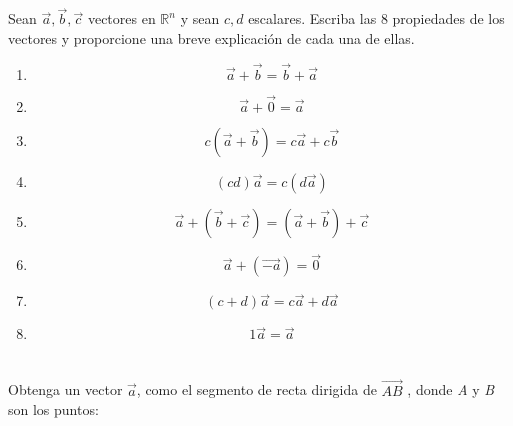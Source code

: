 \documentclass[12pt]{article}
\begin{document}
\section{}

Sean $\vec{a} , \vec{b} , \vec{c}$ vectores en $\mathbb{R}^n$ y sean $c,d$ escalares. Escriba las 8 propiedades de los vectores y proporcione una breve explicación de cada una de ellas.

\begin{enumerate}

\item $$\vec{a}+\vec{b} = \vec{b}+\vec{a}$$

\item $$\vec{a}+\vec{0} = \vec{a}$$

\item $$c(\vec{a}+\vec{b}) = c\vec{a}+c\vec{b}$$

\item $$(cd)\vec{a} = c(d\vec{a})$$

\item $$\vec{a}+(\vec{b}+\vec{c}) = (\vec{a}+\vec{b})+\vec{c}$$

\item $$\vec{a}+(\vec{-a}) = \vec{0}$$

\item $$(c+d)\vec{a} = c\vec{a}+d\vec{a}$$

\item $$1\vec{a} = \vec{a}$$

\end{enumerate}

\section{}
Obtenga un vector $\vec{a}$, como el segmento de recta dirigida de $\vec{AB}$ , donde \textit{A} y \textit{B} son los puntos:
\end{document}

